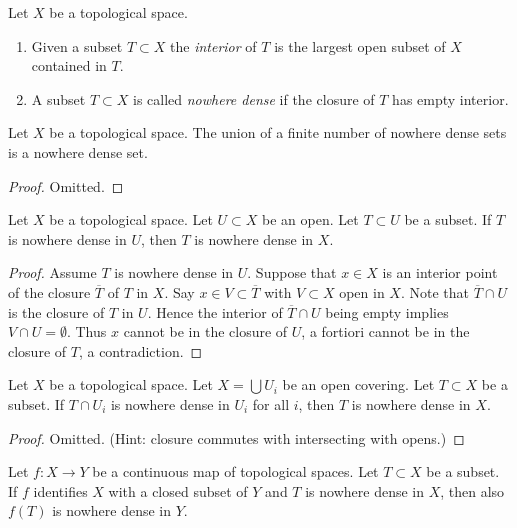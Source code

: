 \begin{definition}
\label{definition-nowhere-dense}
Let $X$ be a topological space.
\begin{enumerate}
\item Given a subset $T \subset X$ the {\it interior} of $T$ is the
largest open subset of $X$ contained in $T$.
\item A subset $T \subset X$ is called {\it nowhere dense} if the closure of
$T$ has empty interior.
\end{enumerate}
\end{definition}

\begin{lemma}
\label{lemma-nowhere-dense}
Let $X$ be a topological space. The union of a finite number of nowhere
dense sets is a nowhere dense set.
\end{lemma}

\begin{proof}
Omitted.
\end{proof}

\begin{lemma}
\label{lemma-image-nowhere-dense-open}
Let $X$ be a topological space.
Let $U \subset X$ be an open.
Let $T \subset U$ be a subset.
If $T$ is nowhere dense in $U$, then $T$ is nowhere dense in $X$.
\end{lemma}

\begin{proof}
Assume $T$ is nowhere dense in $U$.
Suppose that $x \in X$ is an interior point of the closure
$\overline{T}$ of $T$ in $X$. Say $x \in V \subset \overline{T}$
with $V \subset X$ open in $X$. Note that $\overline{T} \cap U$ is
the closure of $T$ in $U$. Hence the interior of $\overline{T} \cap U$
being empty implies $V \cap U = \emptyset$. Thus $x$ cannot be in the
closure of $U$, a fortiori cannot be in the closure of $T$, a contradiction.
\end{proof}

\begin{lemma}
\label{lemma-nowhere-dense-local}
Let $X$ be a topological space.
Let $X = \bigcup U_i$ be an open covering.
Let $T \subset X$ be a subset.
If $T \cap U_i$ is nowhere dense in $U_i$ for all $i$,
then $T$ is nowhere dense in $X$.
\end{lemma}

\begin{proof}
Omitted. (Hint: closure commutes with intersecting with opens.)
\end{proof}

\begin{lemma}
\label{lemma-closed-image-nowhere-dense}
Let $f : X \to Y$ be a continuous map of topological spaces.
Let $T \subset X$ be a subset.
If $f$ identifies $X$ with a closed subset of $Y$
and $T$ is nowhere dense in $X$, then also $f(T)$ is nowhere dense in $Y$.
\end{lemma}

